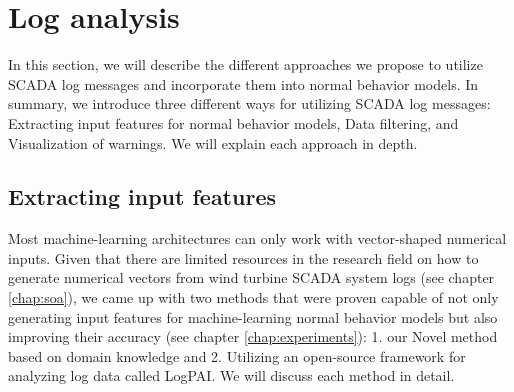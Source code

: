   \clearpage
  
\section{Log analysis}
In this section, we will describe the different approaches we propose to utilize SCADA log messages and incorporate them into normal behavior models.
In summary, we introduce three different ways for utilizing SCADA log messages: Extracting input features for normal behavior models, Data filtering, and Visualization of warnings.
We will explain each approach in depth.

\subsection{Extracting input features}
  Most machine-learning architectures can only work with vector-shaped numerical inputs. Given that there are limited resources in the research field on how to generate 
  numerical vectors from wind turbine SCADA system logs (see chapter \ref{chap:soa}), we came up with two methods that were proven capable of not only generating input features for 
  machine-learning normal behavior models but also improving their accuracy (see chapter \ref{chap:experiments}): 1. our Novel method based on domain knowledge and 
  2. Utilizing an open-source framework for analyzing log data called LogPAI. We will discuss each method in detail.

